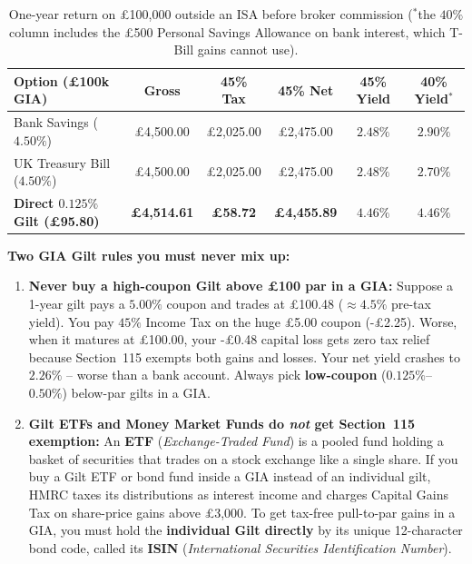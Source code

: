 \begin{table}[ht]
\centering
\small
\setlength{\tabcolsep}{4.8pt}
\begin{tabular}{lccccc}
\toprule
\textbf{Option (\pounds 100k GIA)} & \textbf{Gross} & \textbf{45\% Tax} & \textbf{45\% Net} & \textbf{45\% Yield} & \textbf{40\% Yield$^*$} \\
\midrule
Bank Savings ($4.50\%$) & \pounds 4,500.00 & \pounds 2,025.00 & \pounds 2,475.00 & $2.48\%$ & $2.90\%$ \\
UK Treasury Bill ($4.50\%$) & \pounds 4,500.00 & \pounds 2,025.00 & \pounds 2,475.00 & $2.48\%$ & $2.70\%$ \\
\textbf{Direct $0.125\%$ Gilt (\pounds 95.80)} & \textbf{\pounds 4,514.61} & \textbf{\pounds 58.72} & \textbf{\pounds 4,455.89} & \textbf{$4.46\%$} & \textbf{$4.46\%$} \\
\bottomrule
\end{tabular}
\caption{One-year return on \pounds 100,000 outside an ISA before broker commission ($^*$the $40\%$ column includes the \pounds 500 Personal Savings Allowance on bank interest, which T-Bill gains cannot use).}
\label{tab:cash-parking-100k}
\end{table}

\begin{trapbox}
\textbf{Two GIA Gilt rules you must never mix up:}
\begin{enumerate}
  \item \textbf{Never buy a high-coupon Gilt above \pounds 100 par in a GIA:} Suppose a 1-year gilt pays a $5.00\%$ coupon and trades at \pounds 100.48 ($\approx 4.5\%$ pre-tax yield). You pay $45\%$ Income Tax on the huge \pounds 5.00 coupon (-\pounds 2.25). Worse, when it matures at \pounds 100.00, your -\pounds 0.48 capital loss gets zero tax relief because Section~115 exempts both gains and losses. Your net yield crashes to \textbf{$2.26\%$} -- worse than a bank account. Always pick \textbf{low-coupon} ($0.125\%$--$0.50\%$) below-par gilts in a GIA.
  \item \textbf{Gilt ETFs and Money Market Funds do \emph{not} get Section~115 exemption:} An \textbf{ETF} (\emph{Exchange-Traded Fund}) is a pooled fund holding a basket of securities that trades on a stock exchange like a single share. If you buy a Gilt ETF or bond fund inside a GIA instead of an individual gilt, HMRC taxes its distributions as interest income and charges Capital Gains Tax on share-price gains above \pounds 3,000. To get tax-free pull-to-par gains in a GIA, you must hold the \textbf{individual Gilt directly} by its unique 12-character bond code, called its \textbf{ISIN} (\emph{International Securities Identification Number}).
\end{enumerate}
\end{trapbox}

